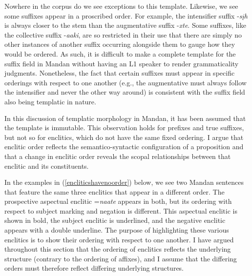 \begin{table}
\caption{Prefix field in Mandan}\label{prefixfieldmandanREredux}

\end{table}

Nowhere in the corpus do we see exceptions to this template. Likewise, we see some suffixes appear in a proscribed order. For example, the intensifier suffix -\textit{sįh} is always closer to the stem than the augmentative suffix -\textit{xte}. Some suffixes, like the collective suffix -\textit{aaki}, are so restricted in their use that there are simply no other instances of another suffix occurring alongside them to gauge how they would be ordered. As such, it is difficult to make a complete template for the suffix field in Mandan without having an L1 speaker to render grammaticality judgments. Nonetheless, the fact that certain suffixes must appear in specific orderings with respect to one another (e.g., the augmentative must always follow the intensifier and never the other way around) is consistent with the suffix field also being templatic in nature.

In this discussion of templatic morphology in Mandan, it has been assumed that the template is immutable. This observation holds for prefixes and true suffixes, but not so for enclitics, which do not have the same fixed ordering. I argue that enclitic order reflects the semantico-syntactic configuration of a proposition and that a change in enclitic order reveals the scopal relationships between that enclitic and its constituents. 

In the examples in (\ref{encliticshavenoorder}) below, we see two Mandan sentences that feature the same three enclitics that appear in a different order. The prospective aspectual enclitic =\textit{naate} appears in both, but its ordering with respect to subject marking and negation is different. This aspectual enclitic is shown in bold, the subject enclitic is underlined, and the negative enclitic appears with a double underline. The purpose of highlighting these various enclitics is to show their ordering with respect to one another. I have argued throughout this section that the ordering of enclitics reflects the underlying structure (contrary to the ordering of affixes), and I assume that the differing orders must therefore reflect differing underlying structures.

